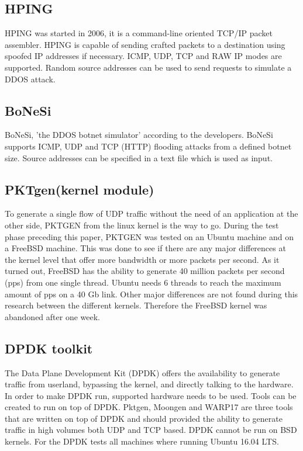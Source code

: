 \subsection{HPING}\label{sub:hping}
HPING was started in 2006, it is a command-line oriented TCP/IP packet assembler. HPING is capable of sending crafted packets to a destination using spoofed IP addresses if necessary. ICMP, UDP, TCP and RAW IP modes are supported. Random source addresses can be used to send requests to simulate a DDOS attack.    

\subsection{BoNeSi}\label{sub:bonesi}
BoNeSi, 'the DDOS botnet simulator' according to the developers. BoNeSi supports ICMP, UDP and TCP (HTTP) flooding attacks from a defined botnet size. Source addresses can be specified in a text file which is used as input.  

\subsection{PKTgen(kernel module)}\label{sub:pktgen}
To generate a single flow of UDP traffic without the need of an application at the other side, PKTGEN from the linux kernel is the way to go. During the test phase preceding this paper, PKTGEN was tested on an Ubuntu machine and on a FreeBSD machine. 
This was done to see if there are any major differences at the kernel level that offer more bandwidth or more packets per second. As it turned out, FreeBSD has the ability to generate 40 million packets per second (pps) from one single thread. Ubuntu needs 6 threads to reach the maximum amount of pps on a 40 Gb link. Other major differences are not found during this research between the different kernels. Therefore the FreeBSD kernel was abandoned after one week. 

\subsection{DPDK toolkit}\label{sub:dpdk}
The Data Plane Development Kit\cite{dpdk} (DPDK) offers the availability to generate traffic from userland, bypassing the kernel, and directly talking to the hardware. In order to make DPDK run, supported hardware needs to be used. Tools can be created to run on top of DPDK. Pktgen, Moongen and WARP17 are three tools that are written on top of DPDK and should provided the ability to generate traffic in high volumes both UDP and TCP based. DPDK cannot be run on BSD kernels. For the DPDK tests all machines where running Ubuntu 16.04 LTS. 

